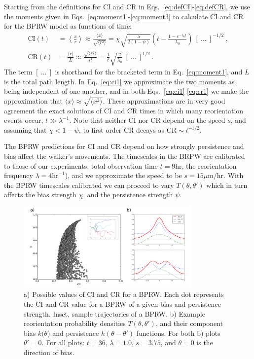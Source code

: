 Starting from the definitions for CI and CR in Eqs.\ \ref{eq:defCI}-\ref{eq:defCR}, we use the moments given in Eqs.\ \ref{eq:moment1}-\ref{eq:moment3} to calculate CI and CR for the BPRW model as functions of time:
\begin{align} \label{eq:ci1}
    \text{CI}(t) &= \left\langle \frac{x}{r} \right\rangle \approx
    \frac{\langle x \rangle}{\sqrt{\langle r^2 \rangle}}
    = \chi \sqrt{\frac{\lambda}{2(1-\psi)}} \left(t -\frac{1-e^{-\lambda_0 t}}{\lambda_0} \right) \
    [ \ \ldots \ ]^{-1/2} \ , \\
    \text{CR}(t) &= \frac{\langle r \rangle}{L} \approx
    \frac{\sqrt{\langle r^2 \rangle}}{st}
    = \frac{1}{t}\sqrt{\frac{2}{\lambda_0}} \
    [ \ \ldots \ ]^{1/2} \ .
    \label{eq:cr1}
\end{align}
The term $[ \ \ldots \ ]$ is shorthand for the bracketed term in Eq.\ \ref{eq:moment1}, and $L$ is the total path length. In Eq.\ \ref{eq:ci1} we approximate the two moments as being independent of one another, and in both Eqs.\ \ref{eq:ci1}-\ref{eq:cr1} we make the approximation that
$\langle x \rangle \approx \sqrt{\langle x^2 \rangle}$.
These approximations are in very good agreement the exact solutions of CI and CR times in which many reorientation events occur, $t \gg \lambda^{-1}$. Note that neither CI nor CR depend on the speed $s$, and assuming that $\chi < 1 - \psi$, to first order CR decays as $\text{CR} \sim t^{-1/2}$.

The BPRW predictions for CI and CR depend on how strongly persistence and bias affect the walker's movements. The timescales in the BRPW are calibrated to those of our experiments; total observation time $t = 9 \text{hr}$, the reorientation frequency
$\lambda = 4 \text{hr}^{-1}$), and we approximate the speed to be
$s = 15 \mu\text{m/hr}$. With the BPRW timescales calibrated we can proceed to vary $T(\theta,\theta')$ which in turn affects the bias strength $\chi$, and the persistence strength $\psi$.

\begin{figure}[ht]
    \centering
    \includegraphics[width=0.80\textwidth]{../fig/ch2_fig6.png}
    \caption{a) Possible values of CI and CR for a BPRW. Each dot represents the CI and CR value for a BPRW of a given bias and persistence strength. Inset, sample trajectories of a BPRW. b) Example reorientation probability densities $T(\theta,\theta')$, and their component bias $k(\theta$) and persistence $h(\theta-\theta')$ functions. For both b) plots $\theta'=0$. For all plots: $t =36$, $\lambda = 1.0$, $s = 3.75$, and $\theta=0$ is the direction of bias.}
    \label{fig:ch2_6}
\end{figure}

